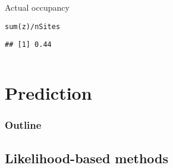 \documentclass[color=usenames,dvipsnames]{beamer}\usepackage[]{graphicx}\usepackage[]{xcolor}
\makeatletter
\newcommand{\hlopt}[1]{\textcolor[rgb]{0,0,0}{#1}}%
\newcommand{\hldef}[1]{\textcolor[rgb]{0,0,0}{#1}}%
\newcommand{\hlkwd}[1]{\textcolor[rgb]{0.004,0.004,0.506}{#1}}%
\newenvironment{kframe}{%
 \def\at@end@of@kframe{}%
 \ifinner\ifhmode%
  \def\at@end@of@kframe{\end{minipage}}%
  \begin{minipage}{\columnwidth}%
 \fi\fi%
 \def\FrameCommand##1{\hskip\@totalleftmargin \hskip-\fboxsep
 \colorbox{shadecolor}{##1}\hskip-\fboxsep
     \hskip-\linewidth \hskip-\@totalleftmargin \hskip\columnwidth}%
 \MakeFramed {\advance\hsize-\width
   \@totalleftmargin\z@ \linewidth\hsize
   \@setminipage}}%
 {\par\unskip\endMakeFramed%
 \at@end@of@kframe}
\newenvironment{knitrout}{}{} %
\makeatother
\begin{document}
\begin{frame}[fragile]
\begin{columns}
\begin{column}{0.6\textwidth}
    {\centering Actual occupancy \\}
\begin{knitrout}\scriptsize
{}\color{fgcolor}\begin{kframe}
\begin{alltt}
\hlkwd{sum}\hldef{(z)} \hlopt{/} \hldef{nSites}
\end{alltt}
\begin{verbatim}
## [1] 0.44
\end{verbatim}
\end{kframe}
\end{knitrout}
  \end{column}
  \end{columns}
\end{frame}



\section{Prediction}



\begin{frame}
  \frametitle{Outline}
  \Large
  \tableofcontents[currentsection]
\end{frame}



\subsection{Likelihood-based methods}
\end{document}
